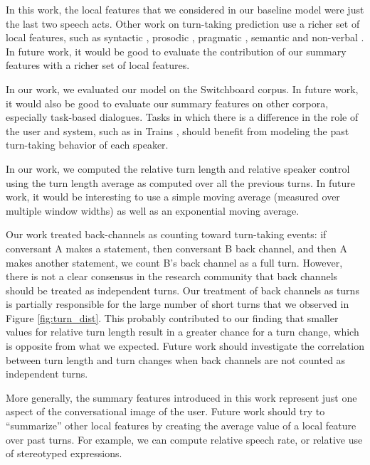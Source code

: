 In this work, the local features that we considered in our baseline model were just the last two speech acts.  Other work on turn-taking prediction use a richer set of local features, such as
%
syntactic \cite{ duncan1972some, sacks1974simplest, ford1996interactional, de2006projecting, magyari2012prediction, atterer2008towards}, prosodic \cite{ duncan1972some, ford1996interactional, shriberg2000prosody, ferrer2003prosody, de2006projecting, reed2009units, raux2012optimizing, hariharan2001robust, atterer2008towards}, pragmatic \cite{ ford1996interactional, garrod2015use, raux2012optimizing}, semantic \cite{raux2012optimizing} and non-verbal \cite{kendon1967some}. In future work, it would be good to evaluate the contribution of our summary features with a richer set of local features.

In our work, we evaluated our model on the Switchboard corpus.  In future work, it would also be good to evaluate our summary features on other corpora, especially task-based dialogues.  Tasks in which there is a difference in the role of the user and system, such as in Trains \cite{HeemanAllen95:cdrom}, should benefit from modeling the past turn-taking behavior of each speaker.

In our work, we computed the relative turn length and relative speaker control using the turn length average as computed over all the previous turns. In future work, it would be interesting to use a simple moving average (measured over multiple window widths) as well as an exponential moving average.


Our work treated back-channels as counting toward turn-taking events:  if conversant A makes a statement, then conversant B back channel, and then A makes another statement, we count B's back channel as a full turn.  However, there is not a clear consensus in the research community that back channels should be treated as independent turns.  Our treatment of back channels as turns is partially responsible for the large number of short turns that we observed in Figure \ref {fig:turn_dist}.  This probably contributed to our finding that smaller values for relative turn length result in a greater chance for a turn change, which is opposite from what we expected. Future work should investigate the correlation between turn length and turn changes when back channels are not counted as independent turns.

More generally, the summary features introduced in this work represent just one aspect of the conversational image of the user. Future work should try to ``summarize'' other local features by creating
the average value of a local feature over past turns. For example, we can compute relative speech rate, or relative use of stereotyped expressions.
